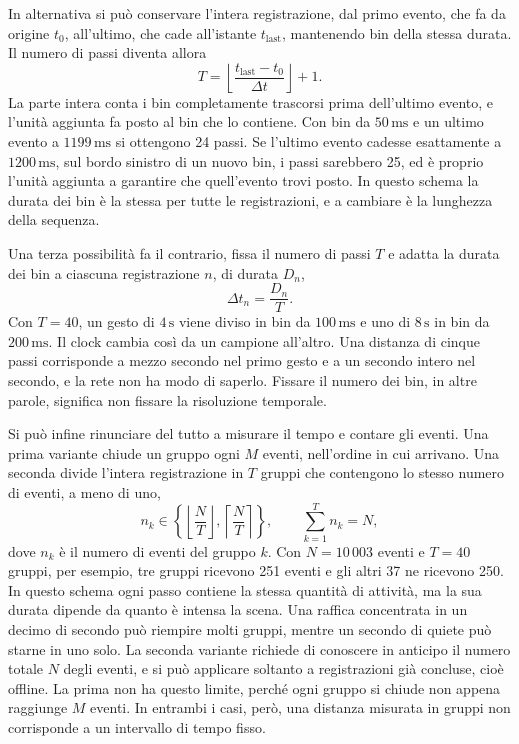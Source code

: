 In alternativa si può conservare l'intera registrazione, dal primo evento, che fa da origine $t_0$, all'ultimo, che cade all'istante $t_{\mathrm{last}}$, mantenendo bin della stessa durata. Il numero di passi diventa allora
\begin{equation}
\label{eq:lunghezza_clock_fisico}
T=\left\lfloor\frac{t_{\mathrm{last}}-t_0}{\Delta t}\right\rfloor+1.
\end{equation}
La parte intera conta i bin completamente trascorsi prima dell'ultimo evento, e l'unità aggiunta fa posto al bin che lo contiene. Con bin da $50\,\mathrm{ms}$ e un ultimo evento a $1199\,\mathrm{ms}$ si ottengono 24 passi. Se l'ultimo evento cadesse esattamente a $1200\,\mathrm{ms}$, sul bordo sinistro di un nuovo bin, i passi sarebbero 25, ed è proprio l'unità aggiunta a garantire che quell'evento trovi posto. In questo schema la durata dei bin è la stessa per tutte le registrazioni, e a cambiare è la lunghezza della sequenza.

Una terza possibilità fa il contrario, fissa il numero di passi $T$ e adatta la durata dei bin a ciascuna registrazione $n$, di durata $D_n$,
\begin{equation}
\label{eq:delta_t_rapporto}
\Delta t_n=\frac{D_n}{T}.
\end{equation}
Con $T=40$, un gesto di $4\,\mathrm{s}$ viene diviso in bin da $100\,\mathrm{ms}$ e uno di $8\,\mathrm{s}$ in bin da $200\,\mathrm{ms}$. Il clock cambia così da un campione all'altro. Una distanza di cinque passi corrisponde a mezzo secondo nel primo gesto e a un secondo intero nel secondo, e la rete non ha modo di saperlo. Fissare il numero dei bin, in altre parole, significa non fissare la risoluzione temporale.

Si può infine rinunciare del tutto a misurare il tempo e contare gli eventi. Una prima variante chiude un gruppo ogni $M$ eventi, nell'ordine in cui arrivano. Una seconda divide l'intera registrazione in $T$ gruppi che contengono lo stesso numero di eventi, a meno di uno,
\begin{equation}
\label{eq:gruppi_eventi_bilanciati}
n_k\in\left\{\left\lfloor\frac NT\right\rfloor,
                 \left\lceil\frac NT\right\rceil\right\},
\qquad \sum_{k=1}^{T}n_k=N,
\end{equation}
dove $n_k$ è il numero di eventi del gruppo $k$. Con $N=10\,003$ eventi e $T=40$ gruppi, per esempio, tre gruppi ricevono 251 eventi e gli altri 37 ne ricevono 250. In questo schema ogni passo contiene la stessa quantità di attività, ma la sua durata dipende da quanto è intensa la scena. Una raffica concentrata in un decimo di secondo può riempire molti gruppi, mentre un secondo di quiete può starne in uno solo. La seconda variante richiede di conoscere in anticipo il numero totale $N$ degli eventi, e si può applicare soltanto a registrazioni già concluse, cioè offline. La prima non ha questo limite, perché ogni gruppo si chiude non appena raggiunge $M$ eventi. In entrambi i casi, però, una distanza misurata in gruppi non corrisponde a un intervallo di tempo fisso.

